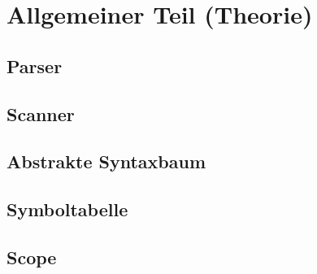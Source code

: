 

\section{Allgemeiner Teil (Theorie)}

\subsection{Parser}

\subsection{Scanner}

\subsection{Abstrakte Syntaxbaum}

\subsection{Symboltabelle}

\subsection{Scope}
